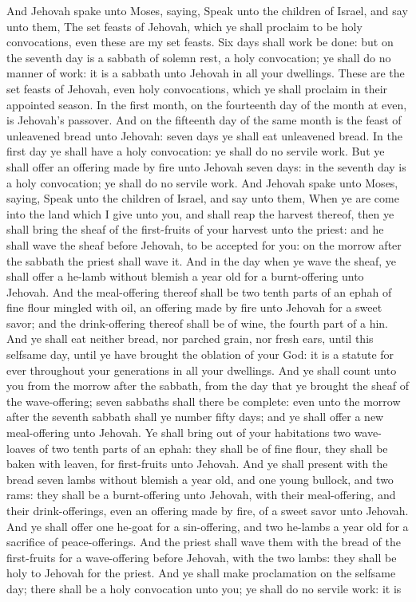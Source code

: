 And Jehovah spake unto Moses, saying, Speak unto the children of Israel, and say unto them, The set feasts of Jehovah, which ye shall proclaim to be holy convocations, even these are my set feasts. Six days shall work be done: but on the seventh day is a sabbath of solemn rest, a holy convocation; ye shall do no manner of work: it is a sabbath unto Jehovah in all your dwellings.  These are the set feasts of Jehovah, even holy convocations, which ye shall proclaim in their appointed season. In the first month, on the fourteenth day of the month at even, is Jehovah’s passover. And on the fifteenth day of the same month is the feast of unleavened bread unto Jehovah: seven days ye shall eat unleavened bread. In the first day ye shall have a holy convocation: ye shall do no servile work. But ye shall offer an offering made by fire unto Jehovah seven days: in the seventh day is a holy convocation; ye shall do no servile work.  And Jehovah spake unto Moses, saying, Speak unto the children of Israel, and say unto them, When ye are come into the land which I give unto you, and shall reap the harvest thereof, then ye shall bring the sheaf of the first-fruits of your harvest unto the priest: and he shall wave the sheaf before Jehovah, to be accepted for you: on the morrow after the sabbath the priest shall wave it. And in the day when ye wave the sheaf, ye shall offer a he-lamb without blemish a year old for a burnt-offering unto Jehovah. And the meal-offering thereof shall be two tenth parts of an ephah of fine flour mingled with oil, an offering made by fire unto Jehovah for a sweet savor; and the drink-offering thereof shall be of wine, the fourth part of a hin. And ye shall eat neither bread, nor parched grain, nor fresh ears, until this selfsame day, until ye have brought the oblation of your God: it is a statute for ever throughout your generations in all your dwellings.  And ye shall count unto you from the morrow after the sabbath, from the day that ye brought the sheaf of the wave-offering; seven sabbaths shall there be complete: even unto the morrow after the seventh sabbath shall ye number fifty days; and ye shall offer a new meal-offering unto Jehovah. Ye shall bring out of your habitations two wave-loaves of two tenth parts of an ephah: they shall be of fine flour, they shall be baken with leaven, for first-fruits unto Jehovah. And ye shall present with the bread seven lambs without blemish a year old, and one young bullock, and two rams: they shall be a burnt-offering unto Jehovah, with their meal-offering, and their drink-offerings, even an offering made by fire, of a sweet savor unto Jehovah. And ye shall offer one he-goat for a sin-offering, and two he-lambs a year old for a sacrifice of peace-offerings. And the priest shall wave them with the bread of the first-fruits for a wave-offering before Jehovah, with the two lambs: they shall be holy to Jehovah for the priest. And ye shall make proclamation on the selfsame day; there shall be a holy convocation unto you; ye shall do no servile work: it is 